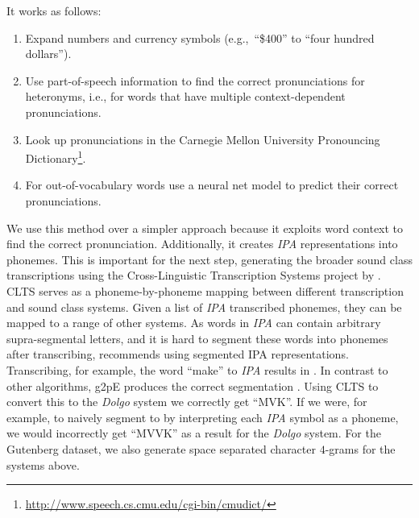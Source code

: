 It works as follows:
\begin{enumerate}
    \item Expand numbers and currency symbols (e.g.,\ ``\$400'' to ``four hundred dollars'').
    \item Use part-of-speech information to find the correct pronunciations for heteronyms, i.e., for words that have multiple context-dependent pronunciations.
    \item Look up pronunciations in the Carnegie Mellon University Pronouncing Dictionary\footnote{\url{http://www.speech.cs.cmu.edu/cgi-bin/cmudict/}}.
    \item For out-of-vocabulary words use a neural net model to predict their correct pronunciations.
\end{enumerate}
We use this method over a simpler approach because it exploits word context to find the correct pronunciation.
Additionally, it creates \textit{IPA} representations  into phonemes.
This is important for the next step, generating the broader sound class transcriptions using the Cross-Linguistic Transcription Systems project by \cite{list2018cltsIntro}.
CLTS serves as a phoneme-by-phoneme mapping between different transcription and sound class systems.
Given a list of \textit{IPA} transcribed phonemes, they can be mapped to a range of other systems.
As words in \textit{IPA} can contain arbitrary supra-segmental letters, and it is hard to segment these words into phonemes after transcribing, \cite{list2018sequence} recommends using segmented IPA representations.
Transcribing, for example, the word ``make'' to \textit{IPA} results in \textipa{[meIk]}.
In contrast to other algorithms, g2pE produces the correct segmentation \textipa{[m eI k]}.
Using CLTS to convert this to the \textit{Dolgo} system we correctly get ``MVK''.
If we were, for example, to naively segment \textipa{[meIk]} to \textipa{[m e I k]} by interpreting each \textit{IPA} symbol as a phoneme, we would incorrectly get ``MVVK'' as a result for the \textit{Dolgo} system.
For the Gutenberg dataset, we also generate space separated character $4$-grams for the systems above.

